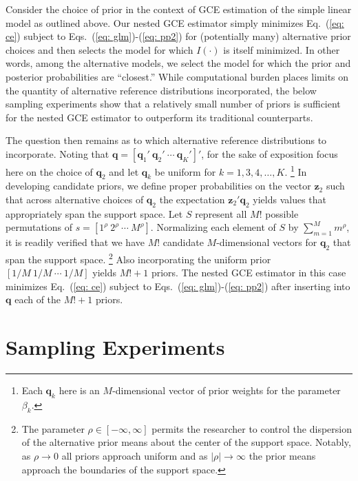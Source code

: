 \documentclass[english]{article}
\begin{document}
Consider the choice of prior in the context of GCE estimation of the simple 
linear model as outlined above.
Our nested GCE estimator simply minimizes Eq.\ (\ref{eq: ce}) subject to 
Eqs.\ (\ref{eq: glm})-(\ref{eq: pp2}) for (potentially many) alternative prior 
choices and then selects the model for which $I(\cdot)$ is itself minimized.
In other words, among the alternative models, we select the model for which the 
prior and posterior probabilities are ``closest.''
While computational burden places limits on the quantity of alternative 
reference distributions incorporated, the below sampling experiments show 
that a relatively small number of priors is sufficient for the nested GCE 
estimator to outperform its traditional counterparts.

The question then remains as to which alternative reference distributions to 
incorporate.
Noting that $\mathbf{q}=[\mathbf{q}_1' ~ \mathbf{q}_2' ~ 
\cdots ~ \mathbf{q}_K' ]'$, for the sake of exposition focus here on the 
choice of $\mathbf{q}_2$ and let $\mathbf{q}_k$ be uniform for 
$k=1,3,4,\ldots, K$.%
\footnote{Each $\mathbf{q}_k$ here is an $M$-dimensional vector of 
 prior weights for the parameter $\beta_k$.}
In developing candidate priors, we define proper probabilities on the vector 
$\mathbf{z}_2$ such that across alternative choices of $\mathbf{q}_2$ the 
expectation $\mathbf{z}_2'\mathbf{q}_2$  yields values that appropriately
span the support space. 
Let $S$ represent all  $M!$ possible permutations of 
$s = [1^\rho ~ 2^\rho ~ \cdots ~ M^\rho]$.
Normalizing each element of $S$ by $\sum_{m=1}^M m^\rho$, it is 
readily verified that we have $M!$ candidate $M$-dimensional vectors for 
$\mathbf{q}_2$ that span the support space.%
\footnote{The parameter $\rho \in [-\infty, \infty]$ permits the researcher
to control the dispersion of the alternative prior means about the center of the 
support space.
Notably, as $\rho \to 0$ all priors approach uniform and as $|\rho| \to 
\infty$ the prior means approach the boundaries of the support space.}
Also incorporating the uniform prior $[1/M ~ 1/M ~ \cdots ~ 1/M]$ yields 
$M! + 1$ priors.
The nested GCE estimator in this case minimizes Eq.\ (\ref{eq: ce}) subject 
to Eqs.\ (\ref{eq: glm})-(\ref{eq: pp2}) after inserting into $\mathbf{q}$ 
each of the $M! + 1$ priors.


\section{Sampling Experiments}
\label{sec: mce}
\end{document}
